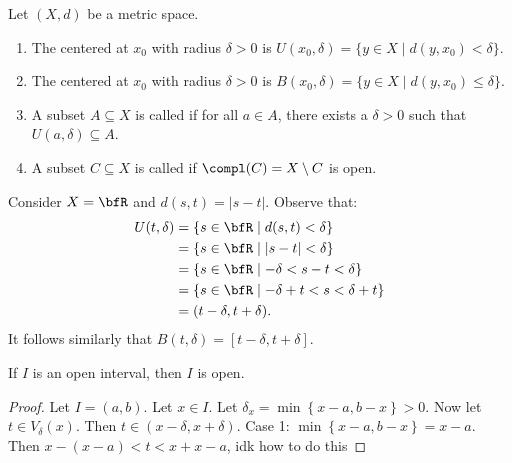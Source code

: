     \begin{definition}
        Let $(X,d)$ be a metric space.
            \begin{enumerate}[label = (\arabic*)]
                \item The  centered at $x_0$ with radius $\delta > 0$ is $U(x_0,\delta) = \{y \in X \mid d(y,x_0) < \delta\}$.
                \item The  centered at $x_0$ with radius $\delta > 0$ is $B(x_0,\delta) = \{y \in X \mid d(y,x_0) \leq \delta\}$.
                \item A subset $A\subseteq X$ is called  if for all $a \in A$, there exists a $\delta >0$ such that $U(a,\delta) \subseteq A$.
                \item A subset $C \subseteq X$ is called  if $\compl(C) = X \setminus C$ is open.
            \end{enumerate}
    \end{definition}

    \begin{example}
        Consider $X = \bfR$ and $d(s,t) = |s-t|$. Observe that:
            \begin{equation*}
            \begin{split}
                U(t,\delta) 
                & = \{s \in \bfR \mid d(s,t) < \delta\} \\
                & = \{s \in \bfR \mid |s-t| < \delta\} \\
                & = \{s \in \bfR \mid -\delta <s-t < \delta\} \\
                & = \{s \in \bfR \mid -\delta + t <s < \delta + t\}\\
                & = (t - \delta , t + \delta).
            \end{split}
            \end{equation*}
        It follows similarly that $B(t, \delta) = [t- \delta,t+\delta]$.
    \end{example}

    \begin{proposition}
        If $I$ is an open interval, then $I$ is open.
    \end{proposition}
        \begin{proof}
            Let $I = (a,b)$. Let $x \in I$. Let $\delta_x = \min{\left\{x-a,b-x\right\}} > 0$. Now let $t \in V_\delta(x)$. Then $t \in (x - \delta, x+\delta)$. Case 1: $\min{\left\{x-a,b-x\right\}} = x-a$. Then $x-(x-a) < t < x + x-a$,
                {\color{red} idk how to do this}
        \end{proof}
    

